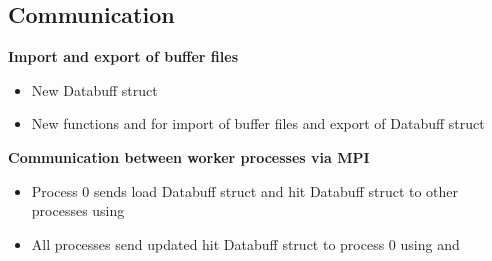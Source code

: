 \subsection{Communication}
\textbf{Import and export of buffer files}
\begin{itemize}[noitemsep,topsep=0pt]
\item New Databuff struct 
\item New functions  and  for import of buffer files and export of Databuff struct
\end{itemize}
\bigskip
\textbf{Communication between worker processes via MPI}
\begin{itemize}[noitemsep,topsep=0pt]
\item Process 0 sends load Databuff struct and hit Databuff struct to other processes using 
\item All processes send updated hit Databuff struct to process 0 using  and 
\end{itemize}

